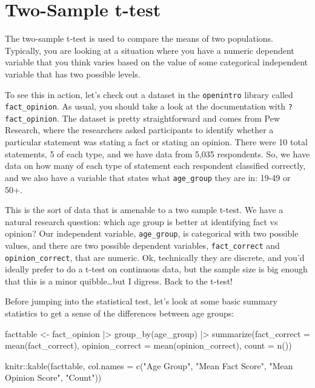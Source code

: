 \documentclass[
  letterpaper,
]{book}
\newenvironment{Shaded}{\begin{snugshade}}{\end{snugshade}}
\newcommand{\AttributeTok}[1]{\textcolor[rgb]{0.40,0.45,0.13}{#1}}
\newcommand{\FunctionTok}[1]{\textcolor[rgb]{0.28,0.35,0.67}{#1}}
\newcommand{\NormalTok}[1]{\textcolor[rgb]{0.00,0.23,0.31}{#1}}
\newcommand{\OtherTok}[1]{\textcolor[rgb]{0.00,0.23,0.31}{#1}}
\newcommand{\SpecialCharTok}[1]{\textcolor[rgb]{0.37,0.37,0.37}{#1}}
\newcommand{\StringTok}[1]{\textcolor[rgb]{0.13,0.47,0.30}{#1}}
\begin{document}
\section{Two-Sample t-test}\label{two-sample-t-test}

The two-sample t-test is used to compare the means of two populations.
Typically, you are looking at a situation where you have a numeric
dependent variable that you think varies based on the value of some
categorical independent variable that has two possible levels.

To see this in action, let's check out a dataset in the
\texttt{openintro} library called \texttt{fact\_opinion}. As usual, you
should take a look at the documentation with \texttt{?fact\_opinion}.
The dataset is pretty straightforward and comes from Pew Research, where
the researchers asked participants to identify whether a particular
statement was stating a fact or stating an opinion. There were 10 total
statements, 5 of each type, and we have data from 5,035 respondents. So,
we have data on how many of each type of statement each respondent
classified correctly, and we also have a variable that states what
\texttt{age\_group} they are in: 19-49 or 50+.

This is the sort of data that is amenable to a two sample t-test. We
have a natural research question: which age group is better at
identifying fact vs opinion? Our independent variable,
\texttt{age\_group}, is categorical with two possible values, and there
are two possible dependent variables, \texttt{fact\_correct} and
\texttt{opinion\_correct}, that are numeric. Ok, technically they are
discrete, and you'd ideally prefer to do a t-test on continuous data,
but the sample size is big enough that this is a minor quibble\ldots but
I digress. Back to the t-test!

Before jumping into the statistical test, let's look at some basic
summary statistics to get a sense of the differences between age groups:

\begin{Shaded}
\begin{Highlighting}[]
\NormalTok{facttable }\OtherTok{\textless{}{-}}\NormalTok{ fact\_opinion }\SpecialCharTok{|\textgreater{}} 
  \FunctionTok{group\_by}\NormalTok{(age\_group) }\SpecialCharTok{|\textgreater{}} 
  \FunctionTok{summarize}\NormalTok{(}\AttributeTok{fact\_correct =} \FunctionTok{mean}\NormalTok{(fact\_correct),}
            \AttributeTok{opinion\_correct =} \FunctionTok{mean}\NormalTok{(opinion\_correct),}
            \AttributeTok{count =} \FunctionTok{n}\NormalTok{())}

\NormalTok{knitr}\SpecialCharTok{::}\FunctionTok{kable}\NormalTok{(facttable,}
             \AttributeTok{col.names =} \FunctionTok{c}\NormalTok{(}\StringTok{"Age Group"}\NormalTok{, }\StringTok{"Mean Fact Score"}\NormalTok{, }\StringTok{"Mean Opinion Score"}\NormalTok{, }\StringTok{"Count"}\NormalTok{))}
\end{Highlighting}
\end{Shaded}
\end{document}
